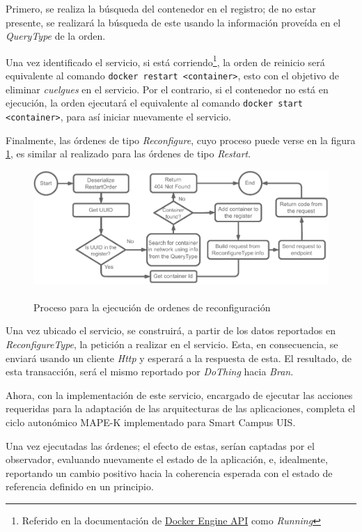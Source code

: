 Primero, se realiza la búsqueda del contenedor en el registro; de no estar presente, se realizará la búsqueda de este usando la información proveída en el \textit{QueryType} de la orden.

Una vez identificado el servicio, si está corriendo\footnote{Referido en la documentación de \href{https://docs.docker.com/engine/api/v1.43/\#tag/Container/operation/ContainerInspect}{Docker Engine API} como \textit{Running}}, la orden de reinicio será equivalente al comando \texttt{docker restart <container>}, esto con el objetivo de eliminar \textit{cuelgues} en el servicio. Por el contrario, si el contenedor no está en ejecución, la orden ejecutará el equivalente al comando \texttt{docker start <container>}, para así iniciar nuevamente el servicio.

Finalmente, las órdenes de tipo \textit{Reconfigure}, cuyo proceso puede verse en la figura \ref{fig:DoThingReconfig}, es similar al realizado para las órdenes de tipo \textit{Restart}. 

\begin{figure}[ht]
    \centering
    \caption{\\Proceso para la ejecución de ordenes de reconfiguración}
    \label{fig:DoThingReconfig}
    \includegraphics[width=0.8\linewidth]{images/DoThingReconfig.pdf}
\end{figure}

Una vez ubicado el servicio, se construirá, a partir de los datos reportados en \textit{ReconfigureType}, la petición a realizar en el servicio. Esta, en consecuencia, se enviará usando un cliente \textit{Http} y esperará a la respuesta de esta. El resultado, de esta transacción, será el mismo reportado por \textit{DoThing} hacia \textit{Bran}.

Ahora, con la implementación de este servicio, encargado de ejecutar las acciones requeridas para la adaptación de las arquitecturas de las aplicaciones, completa el ciclo autonómico MAPE-K implementado para Smart Campus UIS. 

Una vez ejecutadas las órdenes; el efecto de estas, serían captadas por el observador, evaluando nuevamente el estado de la aplicación, e, idealmente, reportando un cambio positivo hacia la coherencia esperada con el estado de referencia definido en un principio.

